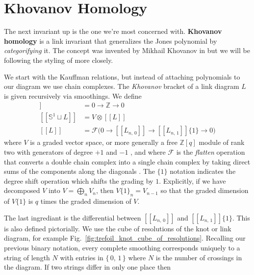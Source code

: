 \section{Khovanov Homology}
    The next invariant up is the one we're most concerned with.
    \textbf{Khovanov homology} is a link invariant that generalizes the
    Jones polynomial by \textit{categorifying} it. The concept was invented by
    Mikhail Khovanov in \cite{Khovanov1999CatJonesPoly} but we will be
    following the styling of \cite{BarNatanKhovanovJones} more closely.
    \par\hfill\par
    We start with the Kauffman relations, but instead of attaching polynomials
    to our diagram we use chain complexes. The \textit{Khovanov} bracket of a
    link diagram $L$ is given recursively via smoothings. We define
    \begin{align}
        [[\emptyset]]&=0\rightarrow\mathbb{Z}\rightarrow{0}\\
        [[\mathbb{S}^{1}\sqcup{L}]]&=V\otimes[[L]]\\
        [[L]]&=\mathcal{F}
        \big(
            0\rightarrow[[L_{n,\,0}]]\rightarrow[[L_{n,\,1}]]\{1\}\rightarrow{0}
        \big)
    \end{align}
    where $V$ is a graded vector space,
    or more generally a free $\mathbb{Z}[q]$
    module of rank two with generators of degree $+1$ and $-1$
    \cite[p.~362]{Khovanov1999CatJonesPoly}, and where
    $\mathcal{F}$ is the \textit{flatten} operation that converts a
    double chain complex into a single chain complex by taking direct sums
    of the components along the diagonals \cite[p.~338]{BarNatanKhovanovJones}.
    The $\{1\}$ notation indicates the degree shift operation which shifts the
    grading by $1$. Explicitly, if we have decomposed $V$ into
    $V=\bigoplus_{n}V_{n}$, then $V\{1\}_{n}=V_{n-1}$ so that the graded
    dimension of $V\{1\}$ is $q$ times the graded dimension of $V$.
    \par\hfill\par
    The last ingrediant is the differential between $[[L_{n,\,0}]]$ and
    $[[L_{n,\,1}]]\{1\}$. This is also defined pictorially. We use the cube of
    resolutions of the knot or link diagram, for example
    Fig.~\ref{fig:trefoil_knot_cube_of_resolutions}. Recalling our previous
    binary notation, every complete smoothing corresponds uniquely to a string
    of length $N$ with entries in $\{\,0,\,1\,\}$ where $N$ is the number of
    crossings in the diagram. If two strings differ in only one place then
